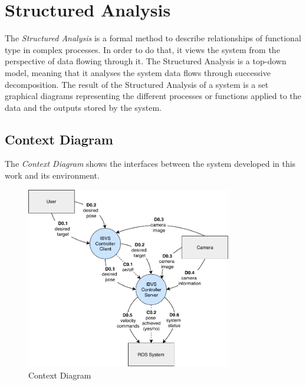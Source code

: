 
\pagebreak

\section{Structured Analysis}
\label{sec:sa}

The \emph{Structured Analysis} \cite{Janschek2011} is a formal method to describe relationships of functional type in complex processes. In order to do that, it views the system from the perspective of data flowing through it. The Structured Analysis is a top-down model, meaning that it analyses the system data flows through successive decomposition. The result of the Structured Analysis of a system is a set graphical diagrams representing the different processes or functions applied to the data and the outputs stored by the system.



\subsection{Context Diagram}
\label{sec:context-diagram}

The \emph{Context Diagram} shows the interfaces between the system developed in this work and its environment.

\begin{figure}[h]
	\caption{Context Diagram}
	\label{fig:sa_diag_01}
	\centering
	\includegraphics[width=0.8\textwidth]{content/chapter_03/images/sa_diagram_01.pdf}
\end{figure}

